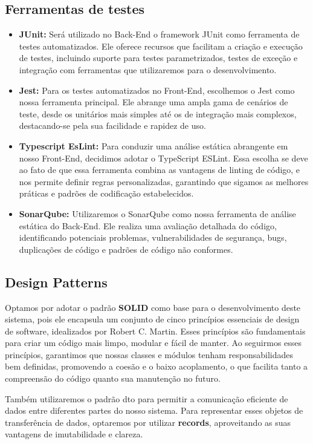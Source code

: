 \subsection{Ferramentas de testes}
\begin{itemize}
    \item \textbf{JUnit:}
     Será utilizado no Back-End o framework JUnit como ferramenta de testes automatizados. Ele oferece recursos que facilitam a criação e execução de testes, incluindo suporte para testes parametrizados, testes de exceção e integração com ferramentas que utilizaremos para o desenvolvimento.
    \item \textbf{Jest:}
    Para os testes automatizados no Front-End, escolhemos o Jest como nossa ferramenta principal. Ele abrange uma ampla gama de cenários de teste, desde os unitários mais simples até os de integração mais complexos, destacando-se pela sua facilidade e rapidez de uso. 
    \item \textbf{Typescript EsLint:}
    Para conduzir uma análise estática abrangente em nosso Front-End, decidimos adotar o TypeScript ESLint. Essa escolha se deve ao fato de que essa ferramenta combina as vantagens de linting de código, e nos permite definir regras personalizadas, garantindo que sigamos as melhores práticas e padrões de codificação estabelecidos.
    \item \textbf{SonarQube:}
    Utilizaremos o SonarQube como nossa ferramenta de análise estática do Back-End. Ele realiza uma avaliação detalhada do código, identificando potenciais problemas, vulnerabilidades de segurança, bugs, duplicações de código e padrões de código não conformes.
\end{itemize}
\subsection{Design Patterns}
Optamos por adotar o padrão \textbf{SOLID} como base para o desenvolvimento deste sistema, pois ele encapsula um conjunto de cinco princípios essenciais de design de software, idealizados por Robert C. Martin. Esses princípios são fundamentais para criar um código mais limpo, modular e fácil de manter. Ao seguirmos esses princípios, garantimos que nossas classes e módulos tenham responsabilidades bem definidas, promovendo a coesão e o baixo acoplamento, o que facilita tanto a compreensão do código quanto sua manutenção no futuro. 

Também utilizaremos o padrão \ac{dto} para permitir a comunicação eficiente de dados entre diferentes partes do nosso sistema. Para representar esses objetos de transferência de dados, optaremos por utilizar \textbf{records}, aproveitando as suas vantagens de imutabilidade e clareza.

